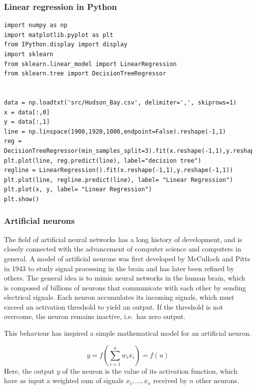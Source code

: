 \documentclass{beamer}
\begin{document}
\begin{frame}
\frametitle{Linear regression in Python}

\begin{block}{}
\begin{verbatim}
import numpy as np
import matplotlib.pyplot as plt
from IPython.display import display
import sklearn
from sklearn.linear_model import LinearRegression
from sklearn.tree import DecisionTreeRegressor


data = np.loadtxt('src/Hudson_Bay.csv', delimiter=',', skiprows=1)
x = data[:,0]
y = data[:,1]
line = np.linspace(1900,1920,1000,endpoint=False).reshape(-1,1)
reg = DecisionTreeRegressor(min_samples_split=3).fit(x.reshape(-1,1),y.reshape(-1,1))
plt.plot(line, reg.predict(line), label="decision tree")
regline = LinearRegression().fit(x.reshape(-1,1),y.reshape(-1,1))
plt.plot(line, regline.predict(line), label= "Linear Regression")
plt.plot(x, y, label= "Linear Regression")
plt.show()
\end{verbatim}
\end{block}
\end{frame}

\begin{frame}
\frametitle{Artificial neurons}

\begin{block}{}

The field of artificial neural networks has a long history of
development, and is closely connected with the advancement of computer
science and computers in general. A model of artificial neurons was
first developed by McCulloch and Pitts in 1943 to study signal
processing in the brain and has later been refined by others. The
general idea is to mimic neural networks in the human brain, which is
composed of billions of neurons that communicate with each other by
sending electrical signals.  Each neuron accumulates its incoming
signals, which must exceed an activation threshold to yield an
output. If the threshold is not overcome, the neuron remains inactive,
i.e.~has zero output.

This behaviour has inspired a simple mathematical model for an artificial neuron.

\[
 y = f\left(\sum_{i=1}^n w_ix_i\right) = f(u)
\]
Here, the output $y$ of the neuron is the value of its activation function, which have as input
a weighted sum of signals $x_i, \dots ,x_n$ received by $n$ other neurons.
\end{block}
\end{frame}
\end{document}
